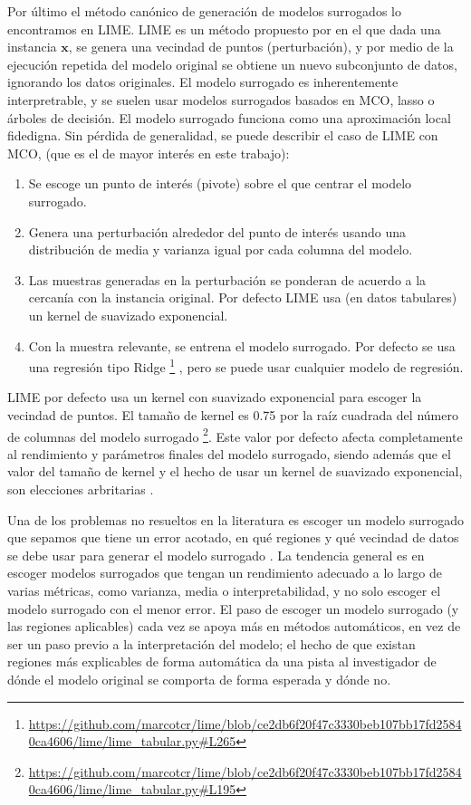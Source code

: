 \documentclass[12pt]{report} %
\begin{document}
Por último el método canónico de generación de modelos surrogados lo encontramos en LIME. LIME es un método propuesto por \cite{Ribeiro2016} en el que dada una instancia $\mathbf{x}$, se genera una vecindad de puntos (perturbación), y por medio de la ejecución repetida del modelo original se obtiene un nuevo subconjunto de datos, ignorando los datos originales. El modelo surrogado es inherentemente interpretrable, y se suelen usar modelos surrogados basados en MCO, lasso o árboles de decisión. El modelo surrogado funciona como una aproximación local fidedigna. Sin pérdida de generalidad, se puede describir el caso de LIME con MCO, (que es el de mayor interés en este trabajo):
\begin{enumerate}
    \item Se escoge un punto de interés (pivote) sobre el que centrar el modelo surrogado.
    \item Genera una perturbación alrededor del punto de interés usando una distribución de media y varianza igual por cada columna del modelo.
    \item Las muestras generadas en la perturbación se ponderan de acuerdo a la cercanía con la instancia original. Por defecto LIME usa (en datos tabulares) un kernel de suavizado exponencial.
    \item Con la muestra relevante, se entrena el modelo surrogado. Por defecto se usa una regresión tipo Ridge \footnote{\url{https://github.com/marcotcr/lime/blob/ce2db6f20f47c3330beb107bb17fd25840ca4606/lime/lime_tabular.py\#L265}} , pero se puede usar cualquier modelo de regresión.
\end{enumerate}
LIME por defecto usa un kernel con suavizado exponencial para escoger la vecindad de puntos. El tamaño de kernel es 0.75 por la raíz cuadrada del número de columnas del modelo surrogado \footnote{\url{https://github.com/marcotcr/lime/blob/ce2db6f20f47c3330beb107bb17fd25840ca4606/lime/lime_tabular.py\#L195}}. Este valor por defecto afecta completamente al rendimiento y parámetros finales del modelo surrogado, siendo además que el valor del tamaño de kernel y el hecho de usar un kernel de suavizado exponencial, son elecciones arbritarias \cite{molnar2025}.

Una de los problemas no resueltos en la literatura es escoger un modelo surrogado que sepamos que tiene un error acotado, en qué regiones y qué vecindad de datos se debe usar para generar el modelo surrogado \cite{Werth2018}. La tendencia general es en escoger modelos surrogados que tengan un rendimiento adecuado a lo largo de varias métricas, como varianza, media o interpretabilidad, y no solo escoger el modelo surrogado con el menor error. El paso de escoger un modelo surrogado (y las regiones aplicables) cada vez se apoya más en métodos automáticos, en vez de ser un paso previo a la interpretación del modelo; el hecho de que existan regiones más explicables de forma automática da una pista al investigador de dónde el modelo original se comporta de forma esperada y dónde no.
\end{document}
